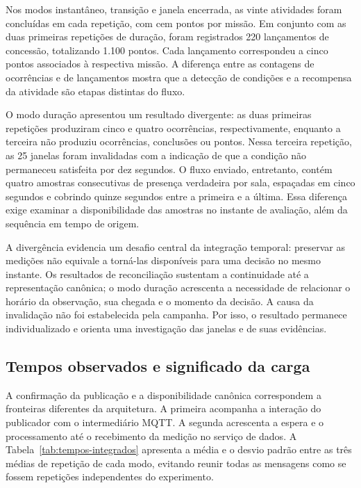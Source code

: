 \documentclass[tcc,capa]{texufpel}
\begin{document}
Nos modos instantâneo, transição e janela encerrada, as vinte atividades foram concluídas em cada repetição, com cem pontos por missão. Em conjunto com as duas primeiras repetições de duração, foram registrados 220 lançamentos de concessão, totalizando 1.100 pontos. Cada lançamento correspondeu a cinco pontos associados à respectiva missão. A diferença entre as contagens de ocorrências e de lançamentos mostra que a detecção de condições e a recompensa da atividade são etapas distintas do fluxo.

O modo duração apresentou um resultado divergente: as duas primeiras repetições produziram cinco e quatro ocorrências, respectivamente, enquanto a terceira não produziu ocorrências, conclusões ou pontos. Nessa terceira repetição, as 25 janelas foram invalidadas com a indicação de que a condição não permaneceu satisfeita por dez segundos. O fluxo enviado, entretanto, contém quatro amostras consecutivas de presença verdadeira por sala, espaçadas em cinco segundos e cobrindo quinze segundos entre a primeira e a última. Essa diferença exige examinar a disponibilidade das amostras no instante de avaliação, além da sequência em tempo de origem.

A divergência evidencia um desafio central da integração temporal: preservar as medições não equivale a torná-las disponíveis para uma decisão no mesmo instante. Os resultados de reconciliação sustentam a continuidade até a representação canônica; o modo duração acrescenta a necessidade de relacionar o horário da observação, sua chegada e o momento da decisão. A causa da invalidação não foi estabelecida pela campanha. Por isso, o resultado permanece individualizado e orienta uma investigação das janelas e de suas evidências.

\subsection{Tempos observados e significado da carga}
A confirmação da publicação e a disponibilidade canônica correspondem a fronteiras diferentes da arquitetura. A primeira acompanha a interação do publicador com o intermediário MQTT. A segunda acrescenta a espera e o processamento até o recebimento da medição no serviço de dados. A Tabela~\ref{tab:tempos-integrados} apresenta a média e o desvio padrão entre as três médias de repetição de cada modo, evitando reunir todas as mensagens como se fossem repetições independentes do experimento.
\end{document}
